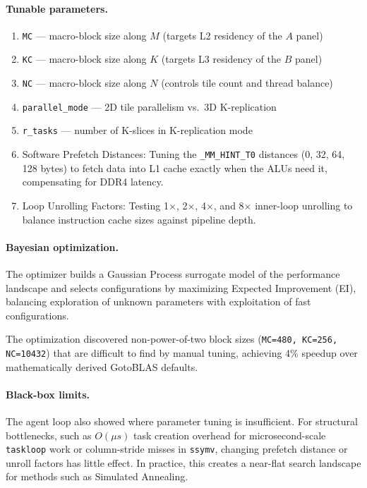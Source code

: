 \documentclass[11pt,a4paper]{article}
\begin{document}
\paragraph{Tunable parameters.}
\begin{enumerate}
  \item \texttt{MC} — macro-block size along $M$ (targets L2 residency of the $A$ panel)
  \item \texttt{KC} — macro-block size along $K$ (targets L3 residency of the $B$ panel)
  \item \texttt{NC} — macro-block size along $N$ (controls tile count and thread balance)
  \item \texttt{parallel\_mode} — 2D tile parallelism vs.\ 3D K-replication
  \item \texttt{r\_tasks} — number of K-slices in K-replication mode
  \item Software Prefetch Distances: Tuning the \texttt{\_MM\_HINT\_T0} distances (0, 32, 64, 128 bytes) to fetch data into L1 cache exactly when the ALUs need it, compensating for DDR4 latency.
  \item Loop Unrolling Factors: Testing 1$\times$, 2$\times$, 4$\times$, and 8$\times$ inner-loop unrolling to balance instruction cache sizes against pipeline depth.
\end{enumerate}

\paragraph{Bayesian optimization.}
The optimizer builds a Gaussian Process surrogate model of the performance landscape and selects configurations by maximizing Expected Improvement (EI), balancing exploration of unknown parameters with exploitation of fast configurations.

The optimization discovered non-power-of-two block sizes (\texttt{MC=480, KC=256, NC=10432}) that are difficult to find by manual tuning, achieving 4\% speedup over mathematically derived GotoBLAS defaults.

\paragraph{Black-box limits.}
The agent loop also showed where parameter tuning is insufficient. For structural bottlenecks, such as $O(\mu s)$ task creation overhead for microsecond-scale \texttt{taskloop} work or column-stride misses in \texttt{ssymv}, changing prefetch distance or unroll factors has little effect. In practice, this creates a near-flat search landscape for methods such as Simulated Annealing.
\end{document}
